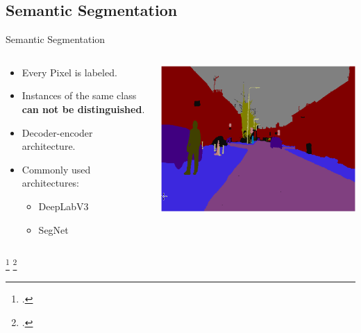 \documentclass[18pt]{beamer}
\begin{document}
\subsection{Semantic Segmentation}
\begin{frame}{Semantic Segmentation}
\begin{columns}
    \begin{column}{0.5\textwidth}
        \begin{itemize}
            \item Every Pixel is labeled.
            \item Instances of the same class \textbf{can not be distinguished}.
            \item Decoder-encoder architecture.
            \item Commonly used architectures:
            \begin{itemize}
                \item DeepLabV3~\footnotemark
                
                \item SegNet~\footnotemark
                
            \end{itemize}
        \end{itemize}
    \end{column}
    \begin{column}{0.5\textwidth}
        \includegraphics[width=\textwidth]{figures/segnet_example.png}
    \end{column}
\end{columns}
\footcitetext{DBLP:journals/corr/abs-1802-02611}
\footcitetext{DBLP:journals/corr/BadrinarayananK15}
\end{frame}
\end{document}
